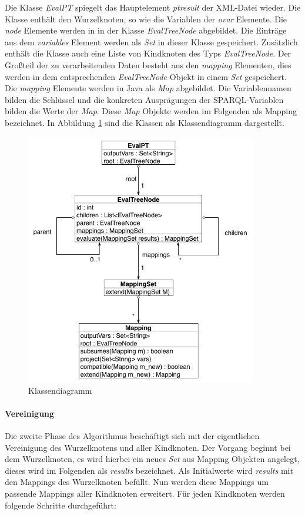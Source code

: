 \documentclass[draft,final]{vutinfth} %
\begin{document}
Die Klasse \textit{EvalPT} spiegelt das Hauptelement \textit{ptresult} der XML-Datei wieder. Die Klasse enthält den Wurzelknoten, so wie die Variablen der \textit{ovar} Elemente. Die \textit{node} Elemente werden in in der Klasse \textit{EvalTreeNode} abgebildet. Die Einträge aus dem \textit{variables} Element werden als \textit{Set} in dieser Klasse gespeichert. Zusätzlich enthält die Klasse auch eine Liste von Kindknoten des Typs \textit{EvalTreeNode}. Der Gro\ss teil der zu verarbeitenden Daten besteht aus den \textit{mapping} Elementen, dies werden in dem entsprechenden \textit{EvalTreeNode} Objekt in einem \textit{Set} gespeichert. Die \textit{mapping} Elemente werden in Java als \textit{Map} abgebildet. Die Variablennamen bilden die Schlüssel und die konkreten Ausprägungen der SPARQL-Variablen bilden die Werte der \textit{Map}. Diese \textit{Map} Objekte werden im Folgenden als Mapping bezeichnet. In Abbildung \ref{klassendiagramm} sind die Klassen als Klassendiagramm dargestellt. 

\begin{figure}[ht]
	\centering
	\includegraphics[width=0.9\textwidth]{Klassendiagramm}
	\caption{Klassendiagramm}
	\label{klassendiagramm}
\end{figure}

\paragraph{Vereinigung}
Die zweite Phase des Algorithmus beschäftigt sich mit der eigentlichen Vereinigung des Wurzelknotens und aller Kindknoten. Der Vorgang beginnt bei dem Wurzelknoten, es wird hierbei ein neues \textit{Set} aus Mapping Objekten angelegt, dieses wird im Folgenden als \textit{results} bezeichnet. Als Initialwerte wird \textit{results} mit den Mappings des Wurzelknoten befüllt. Nun werden diese Mappings um passende Mappings aller Kindknoten erweitert. Für jeden Kindknoten werden folgende Schritte durchgeführt:
\end{document}
